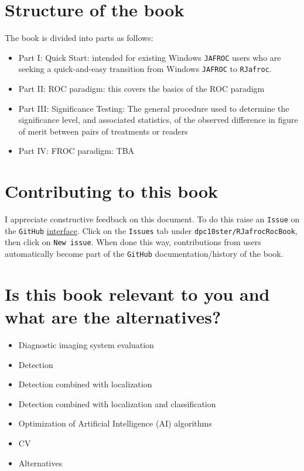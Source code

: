 \documentclass[
]{book}
\providecommand{\tightlist}{%
  \setlength{\itemsep}{0pt}\setlength{\parskip}{0pt}}
\begin{document}
\hypertarget{structure-of-the-book}{%
\section*{Structure of the book}\label{structure-of-the-book}}

The book is divided into parts as follows:

\begin{itemize}
\tightlist
\item
  Part I: Quick Start: intended for existing Windows \texttt{JAFROC} users who are seeking a quick-and-easy transition from Windows \texttt{JAFROC} to \texttt{RJafroc}.
\item
  Part II: ROC paradigm: this covers the basics of the ROC paradigm
\item
  Part III: Significance Testing: The general procedure used to determine the significance level, and associated statistics, of the observed difference in figure of merit between pairs of treatments or readers
\item
  Part IV: FROC paradigm: TBA
\end{itemize}

\hypertarget{contributing-to-this-book}{%
\section*{Contributing to this book}\label{contributing-to-this-book}}

I appreciate constructive feedback on this document. To do this raise an \texttt{Issue} on the \texttt{GitHub} \href{https://github.com/dpc10ster/RJafrocRocBook}{interface}. Click on the \texttt{Issues} tab under \texttt{dpc10ster/RJafrocRocBook}, then click on \texttt{New\ issue}. When done this way, contributions from users automatically become part of the \texttt{GitHub} documentation/history of the book.

\hypertarget{is-this-book-relevant-to-you-and-what-are-the-alternatives}{%
\section*{Is this book relevant to you and what are the alternatives?}\label{is-this-book-relevant-to-you-and-what-are-the-alternatives}}

\begin{itemize}
\tightlist
\item
  Diagnostic imaging system evaluation
\item
  Detection
\item
  Detection combined with localization
\item
  Detection combined with localization and classification
\item
  Optimization of Artificial Intelligence (AI) algorithms
\item
  CV
\item
  Alternatives
\end{itemize}
\end{document}
